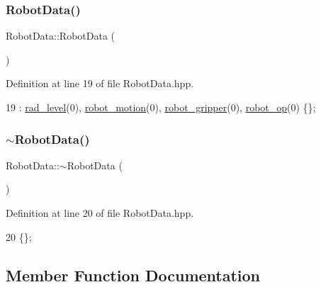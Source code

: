 \subsubsection{\texorpdfstring{Robot\+Data()}{RobotData()}}
{\footnotesize\ttfamily Robot\+Data\+::\+Robot\+Data (\begin{DoxyParamCaption}{ }\end{DoxyParamCaption})\hspace{0.3cm}{\ttfamily [inline]}}



Definition at line 19 of file Robot\+Data.\+hpp.


\begin{DoxyCode}
19 : \hyperlink{class_robot_data_ad41288ab1056c14560356bf1a3e0a652}{rad\_level}(0), \hyperlink{class_robot_data_aaa03c73d21d0d28a8b1b3d384d777a1e}{robot\_motion}(0), \hyperlink{class_robot_data_a83aa1b34c8785aa24e1fc358e50dfc26}{robot\_gripper}(0), 
      \hyperlink{class_robot_data_aa8c48e89aac7db2af1db825a7f3c1f30}{robot\_op}(0) \{\};
\end{DoxyCode}
\mbox{\label{class_robot_data_a1a285ab1dcfea6980f86536b5c2a3c0f}} 
\subsubsection{\texorpdfstring{$\sim$\+Robot\+Data()}{~RobotData()}}
{\footnotesize\ttfamily Robot\+Data\+::$\sim$\+Robot\+Data (\begin{DoxyParamCaption}{ }\end{DoxyParamCaption})\hspace{0.3cm}{\ttfamily [inline]}}



Definition at line 20 of file Robot\+Data.\+hpp.


\begin{DoxyCode}
20 \{\};
\end{DoxyCode}


\subsection{Member Function Documentation}
\mbox{\label{class_robot_data_a5438f77e1f7924adab982401225a2451}} 
